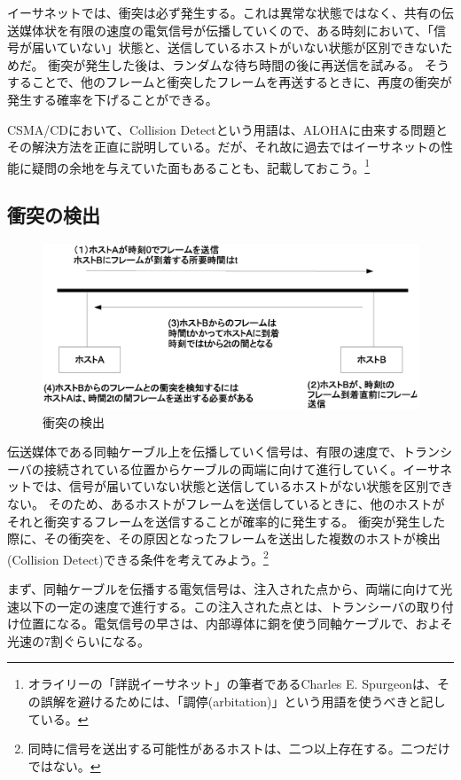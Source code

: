 イーサネットでは、衝突は必ず発生する。これは異常な状態ではなく、共有の伝送媒体状を有限の速度の電気信号が伝播していくので、ある時刻において、「信号が届いていない」状態と、送信しているホストがいない状態が区別できないためだ。
衝突が発生した後は、ランダムな待ち時間の後に再送信を試みる。
そうすることで、他のフレームと衝突したフレームを再送するときに、再度の衝突が発生する確率を下げることができる。

CSMA/CDにおいて、Collision Detectという用語は、ALOHAに由来する問題とその解決方法を正直に説明している。だが、それ故に過去ではイーサネットの性能に疑問の余地を与えていた面もあることも、記載しておこう。\footnote{オライリーの「詳説イーサネット」の筆者であるCharles E. Spurgeonは、その誤解を避けるためには、「調停(arbitation)」という用語を使うべきと記している。}



\subsection{衝突の検出}

\begin{figure}[htbp]
	\includegraphics[width=12cm,clip]{draw/colision.eps}
	\caption{衝突の検出}
	\label{fig:colision}
\end{figure}


伝送媒体である同軸ケーブル上を伝播していく信号は、有限の速度で、トランシーバの接続されている位置からケーブルの両端に向けて進行していく。イーサネットでは、信号が届いていない状態と送信しているホストがない状態を区別できない。
そのため、あるホストがフレームを送信しているときに、他のホストがそれと衝突するフレームを送信することが確率的に発生する。
衝突が発生した際に、その衝突を、その原因となったフレームを送出した複数のホストが検出(Collision Detect)できる条件を考えてみよう。\footnote{同時に信号を送出する可能性があるホストは、二つ以上存在する。二つだけではない。}

まず、同軸ケーブルを伝播する電気信号は、注入された点から、両端に向けて光速以下の一定の速度で進行する。この注入された点とは、トランシーバの取り付け位置になる。電気信号の早さは、内部導体に銅を使う同軸ケーブルで、およそ光速の7割ぐらいになる。

